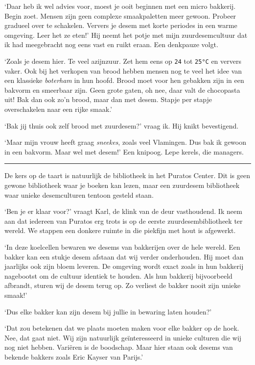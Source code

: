\documentclass[
  11pt,
  dutch,
]{memoir}
\begin{document}
`Daar heb ik wel advies voor, moest je ooit beginnen met een micro
bakkerij. Begin zoet. Mensen zijn geen complexe smaakpaletten meer
gewoon. Probeer gradueel over te schakelen. Ververs je desem met korte
periodes in een warme omgeving. Leer het ze eten!' Hij neemt het potje
met mijn zuurdesemcultuur dat ik had meegebracht nog eens vast en ruikt
eraan. Een denkpauze volgt.

`Zoals je desem hier. Te veel azijnzuur. Zet hem eens op \texttt{24} tot
\texttt{25°C} en ververs vaker. Ook bij het verkopen van brood hebben
mensen nog te veel het idee van een klassieke \emph{boterham} in hun
hoofd. Brood moet voor hen gebakken zijn in een bakvorm en smeerbaar
zijn. Geen grote gaten, oh nee, daar valt de chocopasta uit! Bak dan ook
zo'n brood, maar dan met desem. Stapje per stapje overschakelen naar een
rijke smaak.'

`Bak jij thuis ook zelf brood met zuurdesem?' vraag ik. Hij knikt
bevestigend.

`Maar mijn vrouw heeft graag \emph{sneekes}, zoals veel Vlamingen. Dus
bak ik gewoon in een bakvorm. Maar wel met desem!' Een knipoog. Lepe
kerels, die managers.

\pfbreak

De kers op de taart is natuurlijk de bibliotheek in het Puratos Center.
Dit is geen gewone bibliotheek waar je boeken kan lezen, maar een
zuurdesem bibliotheek waar unieke desemculturen tentoon gesteld staan.

`Ben je er klaar voor?' vraagt Karl, de klink van de deur vasthoudend.
Ik neem aan dat iedereen van Puratos erg trots is op de eerste
zuurdesembibliotheek ter wereld. We stappen een donkere ruimte in die
piekfijn met hout is afgewerkt.

`In deze koelcellen bewaren we desems van bakkerijen over de hele
wereld. Een bakker kan een stukje desem afstaan dat wij verder
onderhouden. Hij moet dan jaarlijks ook zijn bloem leveren. De omgeving
wordt exact zoals in hun bakkerij nagebootst om de cultuur identiek te
houden. Als hun bakkerij bijvoorbeeld afbrandt, sturen wij de desem
terug op. Zo verliest de bakker nooit zijn unieke smaak!'

`Dus elke bakker kan zijn desem bij jullie in bewaring laten houden?'

`Dat zou betekenen dat we plaats moeten maken voor elke bakker op de
hoek. Nee, dat gaat niet. Wij zijn natuurlijk geïnteresseerd in unieke
culturen die wij nog niet hebben. Variëren is de boodschap. Maar hier
staan ook desems van bekende bakkers zoals Eric Kayser van Parijs.'
\end{document}
